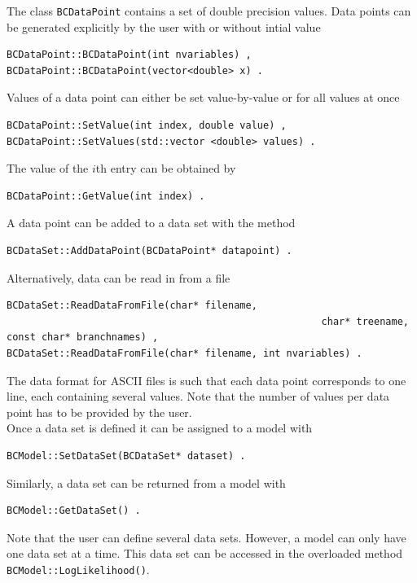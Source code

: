 \documentclass[11pt, a4paper]{article}
\begin{document}
\noindent 
The class \verb|BCDataPoint| contains a set of double precision
values. Data points can be generated explicitly by the user with or
without intial value
%
\begin{verbatim} 
BCDataPoint::BCDataPoint(int nvariables) ,
BCDataPoint::BCDataPoint(vector<double> x) .  
\end{verbatim} 

\noindent 
Values of a data point can either be set value-by-value or for all
values at once
%
\begin{verbatim} 
BCDataPoint::SetValue(int index, double value) , 
BCDataPoint::SetValues(std::vector <double> values) . 
\end{verbatim} 

\noindent 
The value of the $i$th entry can be obtained by 
%
\begin{verbatim}
BCDataPoint::GetValue(int index) . 
\end{verbatim} 

\noindent 
A data point can be added to a data set with the method

\begin{verbatim} 
BCDataSet::AddDataPoint(BCDataPoint* datapoint) . 
\end{verbatim} 

\noindent 
Alternatively, data can be read in from a file
%
\begin{verbatim}
BCDataSet::ReadDataFromFile(char* filename, 
													  char* treename, const char* branchnames) ,
BCDataSet::ReadDataFromFile(char* filename, int nvariables) .
\end{verbatim} 

\noindent 
The data format for ASCII files is such that each data point
corresponds to one line, each containing several values. Note that the
number of values per data point has to be provided by the user. \\

\noindent 
Once a data set is defined it can be assigned to a model with
%
\begin{verbatim}
BCModel::SetDataSet(BCDataSet* dataset) . 
\end{verbatim} 

\noindent 
Similarly, a data set can be returned from a model with 
%
\begin{verbatim}
BCModel::GetDataSet() . 
\end{verbatim} 

\noindent 
Note that the user can define several data sets. However, a model can
only have one data set at a time. This data set can be accessed in the
overloaded method \verb|BCModel::LogLikelihood()|.
\end{document}
